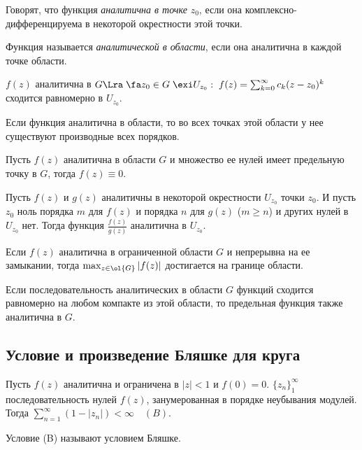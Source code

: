 \documentclass[a4paper]{article}
\begin{document}
\begin{df}
  Говорят, что функция \emph{аналитична в
    точке} $z_0$, если она комплексно-дифференцируема в некоторой
  окрестности этой точки.
\end{df}

\begin{df}
  Функция называется \emph{аналитической в
    области}, если она аналитична в каждой точке области.
\end{df}

\begin{theorem}
$f(z)$ аналитична в $G\Lra\;\fa z_0\in G\;\exi
U_{z_0}:\;f(z)=\sum_{k=0}^{\infty}c_k(z-z_0)^k$ сходится
равномерно в $U_{z_0}.$
\end{theorem}


\begin{theorem}
Если функция аналитична в области, то во всех точках этой области
у нее существуют производные всех порядков.
\end{theorem}

\begin{theorem}[Единственности]
Пусть $f(z)$ аналитична в области $G$ и множество ее нулей имеет
предельную точку в $G$, тогда $f(z)\equiv0.$
\end{theorem}

\begin{theorem}
Пусть $f(z)$ и $g(z)$ аналитичны в некоторой окрестности $U_{z_0}$
точки $z_0$. И пусть $z_0$ ноль порядка $m$ для $f(z)$ и порядка
$n$ для $g(z)$ ($m\ge n$) и других нулей в $U_{z_0}$ нет. Тогда
функция $\frac {f(z)}{g(z)}$ аналитична в $U_{z_0}$.
\end{theorem}

\begin{theorem}
Если $f(z)$ аналитична в ограниченной области $G$ и непрерывна на
ее замыкании, тогда $\max_{z\in \ol{G}}|f(z)|$ достигается
на границе области.
\end{theorem}

\begin{theorem}[Вейерштрасс]
Если последовательность аналитических в области $G$ функций
сходится равномерно на любом компакте из этой области, то
предельная функция также аналитична в $G.$
\end{theorem}

\subsection{Условие и произведение Бляшке для круга}
\begin{theorem}
Пусть $f(z)$ аналитична и ограничена в $|z|<1$ и $f(0)=0$.
$\{z_n\}_1^{\infty}$ последовательность нулей $f(z)$,
занумерованная в порядке неубывания модулей. Тогда
$\sum_{n=1}^{\infty}(1-|z_n|)<\infty\quad(B).$
\end{theorem}
Условие (B) называют условием Бляшке.
\end{document}
